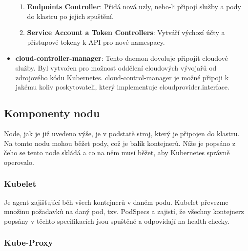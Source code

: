 \begin{itemize}
\begin{enumerate}
		\item \textbf{Endpoints Controller}: Přidá nová uzly, nebo-li připojí služby a pody do klastru po jejich spuštění. 
	
		\item \textbf{Service Account a Token Controllers}: Vytváří výchozí účty a přístupové tokeny k API pro nové namespacy. 
	\end{enumerate}
	
	\item \textbf{cloud-controller-manager}: Tento daemon dovoluje připojit cloudové služby. Byl vytvořen pro možnost oddělení cloudových vývojařů od zdrojového kódu Kubernetes. cloud-control-manager je možné připoji k jakému koliv poskytovateli, který implementuje cloudprovider.interface.
\end{itemize}

\subsection{Komponenty nodu}

Node, jak je již uvedeno výše, je v podstatě stroj, který je připojen do klastru. Na tomto nodu mohou běžet pody, což je balík kontejnerů. Níže je popsáno z čeho se tento node skládá a co na něm musí běžet, aby Kubernetes správně operovalo.

\subsubsection{Kubelet}

Je agent zajišťující běh všech kontejnerů v daném podu. Kubelet převezme množinu požadavků na daný pod, tzv. PodSpecs a zajistí, že všechny kontejnerz popsány v těchto specifikacích jsou spuštěné a odpovídají na health checky. 

\subsubsection{Kube-Proxy}

